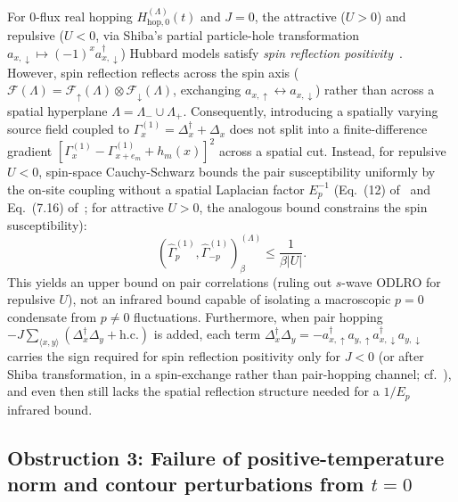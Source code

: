 \documentclass[11pt]{article}
\theoremstyle{definition}
\theoremstyle{remark}
\newcommand{\calF}{\mathcal{F}}
\begin{document}
For $0$-flux real hopping $H_{\mathrm{hop},0}^{(\Lambda)}(t)$ and $J = 0$, the attractive ($U > 0$) and repulsive ($U < 0$, via Shiba's partial particle-hole transformation $a_{x,\downarrow} \mapsto (-1)^x a_{x,\downarrow}^\dagger$) Hubbard models satisfy \emph{spin reflection positivity}~\cite{lieb1989,kubo1990}. However, spin reflection reflects across the spin axis ($\calF(\Lambda) = \calF_\uparrow(\Lambda) \otimes \calF_\downarrow(\Lambda)$, exchanging $a_{x,\uparrow} \leftrightarrow a_{x,\downarrow}$) rather than across a spatial hyperplane $\Lambda = \Lambda_- \cup \Lambda_+$. Consequently, introducing a spatially varying source field coupled to $\Gamma_x^{(1)} = \Delta_x^\dagger + \Delta_x$ does not split into a finite-difference gradient $[\Gamma_x^{(1)} - \Gamma_{x+e_m}^{(1)} + h_m(x)]^2$ across a spatial cut. Instead, for repulsive $U < 0$, spin-space Cauchy-Schwarz bounds the pair susceptibility uniformly by the on-site coupling without a spatial Laplacian factor $E_p^{-1}$ (Eq.~(12) of~\cite{kubo1990} and Eq.~(7.16) of~\cite{koma2022}; for attractive $U > 0$, the analogous bound constrains the spin susceptibility):
\begin{equation*}
(\hat{\Gamma}_p^{(1)}, \hat{\Gamma}_{-p}^{(1)})_\beta^{(\Lambda)} \le \frac{1}{\beta |U|}.
\end{equation*}
This yields an upper bound on pair correlations (ruling out $s$-wave ODLRO for repulsive $U$), not an infrared bound capable of isolating a macroscopic $p = 0$ condensate from $p \ne 0$ fluctuations. Furthermore, when pair hopping $-J\sum_{\langle x,y\rangle}(\Delta_x^\dagger\Delta_y + \text{h.c.})$ is added, each term $\Delta_x^\dagger\Delta_y = -a_{x,\uparrow}^\dagger a_{y,\uparrow} a_{x,\downarrow}^\dagger a_{y,\downarrow}$ carries the sign required for spin reflection positivity only for $J < 0$ (or after Shiba transformation, in a spin-exchange rather than pair-hopping channel; cf.~\cite{goto2026}), and even then still lacks the spatial reflection structure needed for a $1/E_p$ infrared bound.

\subsection{Obstruction 3: Failure of positive-temperature norm and contour perturbations from \texorpdfstring{$t = 0$}{t = 0}}\label{subsec:obs3}
\end{document}
